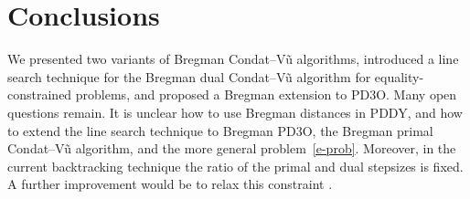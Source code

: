 \documentclass[letterpaper,11pt]{article}
\begin{document}
\section{Conclusions}

We presented two variants of Bregman Condat--V\~u algorithms,
introduced a line search technique
for the Bregman dual Condat--V\~u algorithm for equality-constrained
problems, and proposed a Bregman extension to PD3O.
Many open questions remain.
It is unclear how to use Bregman distances in PDDY,
and how to extend the line search technique to Bregman PD3O,
the Bregman primal Condat--V\~u algorithm, 
and the more general problem~\eqref{e-prob}.
Moreover, in the current backtracking technique the ratio of the
primal and dual stepsizes is fixed.
A further improvement would be to relax this constraint
\cite{MaP:18,ADH+:21}.

%
%
\end{document}
